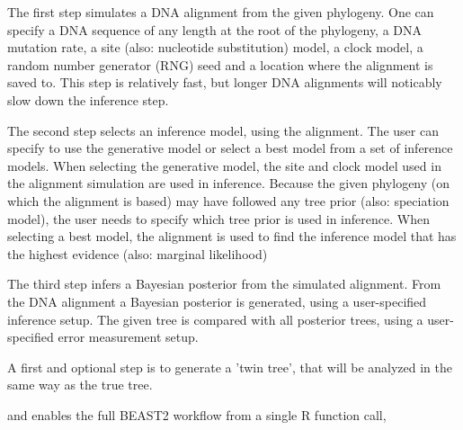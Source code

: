 \documentclass{article}
\begin{document}
The first step simulates a DNA alignment from the given phylogeny.
One can specify a DNA sequence
of any length at the root of the phylogeny, a DNA mutation rate, a
site (also: nucleotide substitution) model, 
a clock model, a random number generator (RNG) seed and a location
where the alignment is saved to. This step is relatively fast, but longer
DNA alignments will noticably slow down the inference step.

The second step selects an inference model, using the alignment.
The user can specify to use the generative model or select a best model
from a set of inference models. When selecting the generative model,
the site and clock model used in the alignment simulation are used
in inference. Because the given phylogeny (on which the alignment is based)
may have followed any tree prior (also: speciation model), the user needs
to specify which tree prior is used in inference. When selecting a best
model, the alignment is used to find the inference model that has the
highest evidence (also: marginal likelihood)



The third step infers a Bayesian posterior from the simulated alignment.
From the
DNA alignment a Bayesian posterior is generated, using a user-specified
inference setup. The given tree is compared with all posterior trees, using
a user-specified error measurement setup.


A first and optional step is to generate a 'twin tree', that will be
analyzed in the same way as the true tree.

and enables the full BEAST2 workflow from a single R function call,

\end{document}

